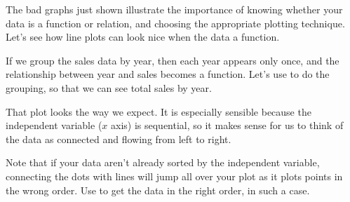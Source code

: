 \documentclass[letterpaper,10pt,english]{sphinxmanual}
\begin{document}
\noindent{}

The bad graphs just shown illustrate the importance of knowing whether your data is a function or relation, and choosing the appropriate plotting technique.  Let’s see how line plots can look nice when the data  a function.

 If we group the sales data by year, then each year appears only once, and the relationship between year and sales becomes a function.  Let’s use  to do the grouping, so that we can see total sales by year.

\begin{sphinxVerbatim}[commandchars=\\\{\}]
    
  \PYG{p}{[}\PYG{p}{]}   
      
  
  
\end{sphinxVerbatim}

\noindent{}

That plot looks the way we expect.  It is especially sensible because the independent variable (\(x\) axis) is sequential, so it makes sense for us to think of the data as connected and flowing from left to right.

Note that if your data aren’t already sorted by the independent variable, connecting the dots with lines will jump all over your plot as it plots points in the wrong order.  Use  to get the data in the right order, in such a case.
\end{document}
